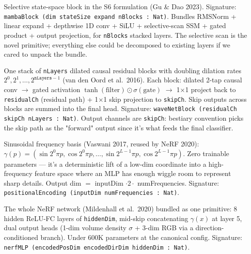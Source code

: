 \begin{definition}
  \label{layer:mambaBlock}
  \leanok
  Selective state-space block in the S6 formulation (Gu \& Dao 2023).
  Signature: \texttt{mambaBlock (dim stateSize expand nBlocks : Nat)}.
  Bundles RMSNorm + linear expand + depthwise 1D conv + SiLU +
  selective-scan SSM + gated product + output projection, for
  \texttt{nBlocks} stacked layers. The selective scan is the novel
  primitive; everything else could be decomposed to existing layers if
  we cared to unpack the bundle.
\end{definition}

\begin{definition}
  \label{layer:waveNetBlock}
  \leanok
  One stack of \texttt{nLayers} dilated causal residual blocks with
  doubling dilation rates $2^0, 2^1, \ldots, 2^{\texttt{nLayers}-1}$
  (van den Oord et al.\ 2016). Each block: dilated 2-tap causal conv
  $\to$ gated activation $\tanh(\text{filter}) \odot \sigma(\text{gate})$
  $\to$ 1$\times$1 project back to \texttt{residualCh} (residual path) +
  1$\times$1 skip projection to \texttt{skipCh}. Skip outputs across
  blocks are summed into the final head. Signature:
  \texttt{waveNetBlock (residualCh skipCh nLayers : Nat)}. Output
  channels are \texttt{skipCh}: bestiary convention picks the skip path
  as the "forward" output since it's what feeds the final classifier.
\end{definition}

\begin{definition}
  \label{layer:positionalEncoding}
  \leanok
  Sinusoidal frequency basis (Vaswani 2017, reused by NeRF 2020):
  $\gamma(p) = (\sin 2^0 \pi p, \cos 2^0 \pi p, \ldots, \sin 2^{L-1} \pi p, \cos 2^{L-1} \pi p)$.
  Zero trainable parameters --- it's a deterministic lift of a
  low-dim coordinate into a high-frequency feature space where an
  MLP has enough wiggle room to represent sharp details. Output dim
  $=$ inputDim $\cdot 2 \cdot$ numFrequencies. Signature:
  \texttt{positionalEncoding (inputDim numFrequencies : Nat)}.
\end{definition}

\begin{definition}
  \label{layer:nerfMLP}
  \leanok
  The whole NeRF network (Mildenhall et al.\ 2020) bundled as one
  primitive: 8 hidden ReLU-FC layers of \texttt{hiddenDim}, mid-skip
  concatenating $\gamma(x)$ at layer 5, dual output heads
  (1-dim volume density $\sigma$ + 3-dim RGB via a direction-conditioned
  branch). Under 600K parameters at the canonical config. Signature:
  \texttt{nerfMLP (encodedPosDim encodedDirDim hiddenDim : Nat)}.
\end{definition}

